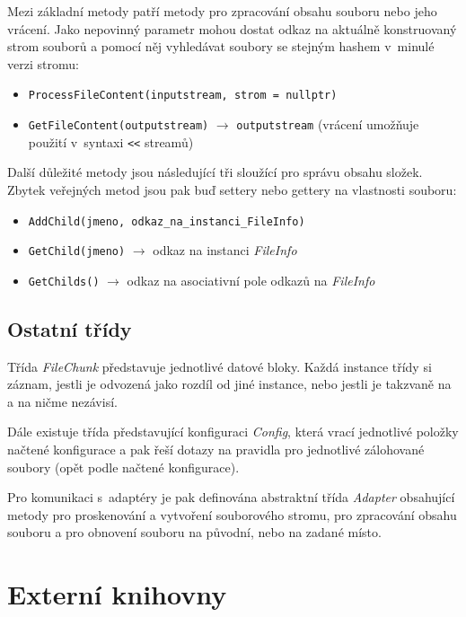 Mezi základní metody patří metody pro zpracování obsahu souboru nebo jeho
vrácení. Jako nepovinný parametr mohou dostat odkaz na aktuálně konstruovaný
strom souborů a pomocí něj vyhledávat soubory se stejným hashem v~minulé verzi
stromu:

\begin{itemize}
	\item\texttt{ProcessFileContent(inputstream, strom = nullptr)}
	\item\texttt{GetFileContent(outputstream)} $\rightarrow$
	\texttt{outputstream} (vrácení umožňuje použití v~syntaxi \texttt{<\relax<} streamů)
\end{itemize}

Další důležité metody jsou následující tři sloužící pro správu obsahu složek.
Zbytek veřejných metod jsou pak buď settery nebo gettery na vlastnosti souboru:

\begin{itemize}
	\item\texttt{AddChild(jmeno, odkaz\_na\_instanci\_FileInfo)}
	\item\texttt{GetChild(jmeno)} $\rightarrow$ odkaz na instanci {\it FileInfo}
	\item\texttt{GetChilds()} $\rightarrow$ odkaz na asociativní pole odkazů
	na {\it FileInfo}
\end{itemize}

\subsection{Ostatní třídy}

Třída {\it FileChunk} představuje jednotlivé datové bloky. Každá instance třídy
si záznam, jestli je odvozená jako rozdíl od jiné instance, nebo jestli je
takzvaně na  a na ničme nezávisí.

Dále existuje třída představující konfiguraci {\it Config}, která vrací
jednotlivé položky načtené konfigurace a pak řeší dotazy na pravidla pro
jednotlivé zálohované soubory (opět podle načtené konfigurace).

Pro komunikaci s~adaptéry je pak definována abstraktní třída {\it Adapter}
obsahující metody pro proskenování a vytvoření souborového stromu, pro
zpracování obsahu souboru a pro obnovení souboru na původní, nebo na zadané
místo.

\section{Externí knihovny}

